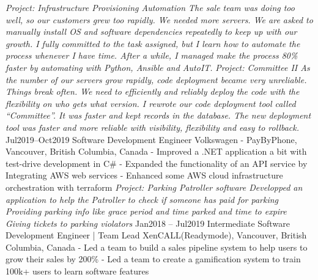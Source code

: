 \documentclass[9pt]{developercv} %
\begin{document}
\begin{entrylist}
{            \textit{Project: Infrastructure Provisioning Automation\newline
            The sale team was doing too well, so our customers grew too rapidly. We needed more servers.  
            We are asked to manually install OS and software dependencies repeatedly to keep up with our growth. I fully committed to the task assigned, but I learn how to automate the process whenever I have time. After a while, I managed make the process 80\% faster by automating with Python, Ansible and AutoIT.\newline\newline}
            \textit{Project: Committee II\newline
            As the number of our servers grow rapidly, code deployment became very unreliable. Things break often. We need to efficiently and reliably deploy the code with the flexibility on who gets what version. I rewrote our code deployment tool called “Committee”. It was faster and kept records in the database. The new deployment tool was faster and more reliable with visibility, flexibility and easy to rollback.\newline}
        }
		\entry
		{Jul2019--Oct2019}
		{Software Development Engineer}
		{Volkswagen - PayByPhone, Vancouver, British Columbia, Canada}
		{
            - Improved a .NET application a bit with test-drive development in C\#\newline
            - Expanded the functionality of an API service by Integrating AWS web services\newline 
            - Enhanced some AWS cloud infrastructure orchestration with terraform\newline\newline
			\textit{Project: Parking Patroller software\newline
            Developped an application to help the Patroller to check if someone has paid for parking
            Providing parking info like grace period and time parked and time to expire
            Giving tickets to parking violators \newline}
        }
	\entry
		{Jan2018 -- Jul2019}
		{Intermediate Software Development Engineer | Team Lead}
		{XenCALL(Readymode), Vancouver, British Columbia, Canada}
		{
            - Led a team to build a sales pipeline system to help users to grow their sales by 200\%\newline
            - Led a team to create a gamification system to train 100k+ users to learn software features\newline
}
\end{entrylist}
\end{document}
